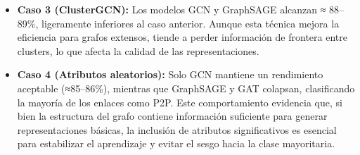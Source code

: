 \begin{itemize}
\begin{itemize}
    \item \textbf{Caso 3 (ClusterGCN):}  
    Los modelos GCN y GraphSAGE alcanzan ≈ 88–89\%, ligeramente inferiores al caso anterior.  
    Aunque esta técnica mejora la eficiencia para grafos extensos, tiende a perder información de frontera entre clusters, lo que afecta la calidad de las representaciones.  
    
    \item \textbf{Caso 4 (Atributos aleatorios):}  
    Solo GCN mantiene un rendimiento aceptable (≈85–86\%), mientras que GraphSAGE y GAT colapsan, clasificando la mayoría de los enlaces como P2P.  
    Este comportamiento evidencia que, si bien la estructura del grafo contiene información suficiente para generar representaciones básicas, la inclusión de atributos significativos es esencial para estabilizar el aprendizaje y evitar el sesgo hacia la clase mayoritaria.  
    \end{itemize}
\end{itemize}










